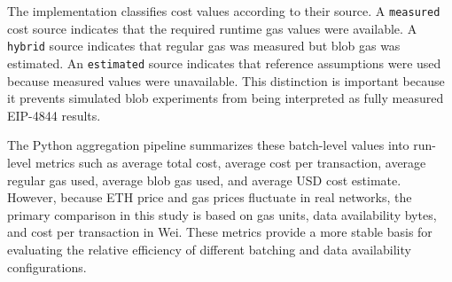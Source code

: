 The implementation classifies cost values according to their source. A \texttt{measured} cost source indicates that the required runtime gas values were available. A \texttt{hybrid} source indicates that regular gas was measured but blob gas was estimated. An \texttt{estimated} source indicates that reference assumptions were used because measured values were unavailable. This distinction is important because it prevents simulated blob experiments from being interpreted as fully measured EIP-4844 results.

The Python aggregation pipeline summarizes these batch-level values into run-level metrics such as average total cost, average cost per transaction, average regular gas used, average blob gas used, and average USD cost estimate. However, because ETH price and gas prices fluctuate in real networks, the primary comparison in this study is based on gas units, data availability bytes, and cost per transaction in Wei. These metrics provide a more stable basis for evaluating the relative efficiency of different batching and data availability configurations.
